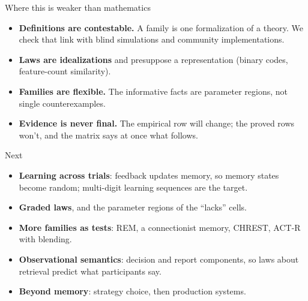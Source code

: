 \documentclass[aspectratio=169,11pt]{beamer}
\begin{document}
\begin{frame}{Where this is weaker than mathematics}
  \begin{itemize}
    \item \textbf{Definitions are contestable.} A family is one formalization of a theory. We check that link with blind simulations and community implementations.
    \item \textbf{Laws are idealizations} and presuppose a representation (binary codes, feature-count similarity).
    \item \textbf{Families are flexible.} The informative facts are parameter regions, not single counterexamples.
    \item \textbf{Evidence is never final.} The empirical row will change; the proved rows won't, and the matrix says at once what follows.
  \end{itemize}
\end{frame}

\begin{frame}{Next}
  \begin{itemize}
    \item \textbf{Learning across trials}: feedback updates memory, so memory states become random; multi-digit learning sequences are the target.
    \item \textbf{Graded laws}, and the parameter regions of the ``lacks'' cells.
    \item \textbf{More families as tests}: REM, a connectionist memory, CHREST, ACT-R with blending.
    \item \textbf{Observational semantics}: decision and report components, so laws about retrieval predict what participants say.
    \item \textbf{Beyond memory}: strategy choice, then production systems.
  \end{itemize}
\end{frame}
\end{document}
